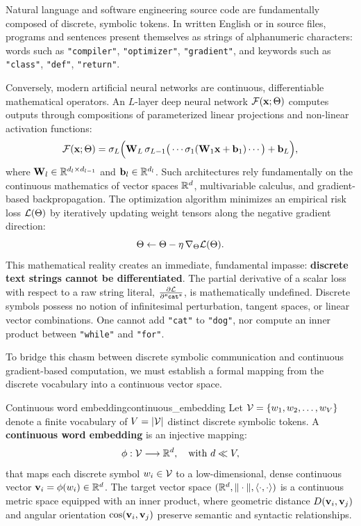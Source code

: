 \documentclass[../../main.tex]{subfiles}
\begin{document}
Natural language and software engineering source code are fundamentally composed of discrete, symbolic tokens. In written English or in source files, programs and sentences present themselves as strings of alphanumeric characters: words such as \texttt{"compiler"}, \texttt{"optimizer"}, \texttt{"gradient"}, and keywords such as \texttt{"class"}, \texttt{"def"}, \texttt{"return"}.

Conversely, modern artificial neural networks are continuous, differentiable mathematical operators. An $L$-layer deep neural network $\mathcal{F}(\mathbf{x}; \Theta)$ computes outputs through compositions of parameterized linear projections and non-linear activation functions:
\begin{equation}
\label{eq:neural_operator}
\mathcal{F}(\mathbf{x}; \Theta) = \sigma_L \Big( \mathbf{W}_L \, \sigma_{L-1}\big( \cdots \sigma_1(\mathbf{W}_1 \mathbf{x} + \mathbf{b}_1) \cdots \big) + \mathbf{b}_L \Big),
\end{equation}
where $\mathbf{W}_l \in \mathbb{R}^{d_l \times d_{l-1}}$ and $\mathbf{b}_l \in \mathbb{R}^{d_l}$. Such architectures rely fundamentally on the continuous mathematics of vector spaces $\mathbb{R}^d$, multivariable calculus, and gradient-based backpropagation. The optimization algorithm minimizes an empirical risk loss $\mathcal{L}(\Theta)$ by iteratively updating weight tensors along the negative gradient direction:
\begin{equation}
\label{eq:gradient_update_rule}
\Theta \leftarrow \Theta - \eta \, \nabla_\Theta \mathcal{L}(\Theta).
\end{equation}
This mathematical reality creates an immediate, fundamental impasse: \textbf{discrete text strings cannot be differentiated}. The partial derivative of a scalar loss with respect to a raw string literal, $\frac{\partial \mathcal{L}}{\partial \text{\texttt{"cat"}}}$, is mathematically undefined. Discrete symbols possess no notion of infinitesimal perturbation, tangent spaces, or linear vector combinations. One cannot add \texttt{"cat"} to \texttt{"dog"}, nor compute an inner product between \texttt{"while"} and \texttt{"for"}.

To bridge this chasm between discrete symbolic communication and continuous gradient-based computation, we must establish a formal mapping from the discrete vocabulary into a continuous vector space.

\begin{definition}{Continuous word embedding}{continuous_embedding}
Let $\mathcal{V} = \{w_1, w_2, \dots, w_V\}$ denote a finite vocabulary of $V = |\mathcal{V}|$ distinct discrete symbolic tokens. A \textbf{continuous word embedding} is an injective mapping:
\begin{equation}
\label{eq:embedding_mapping_def}
\phi: \mathcal{V} \longrightarrow \mathbb{R}^d, \quad \text{with } d \ll V,
\end{equation}
that maps each discrete symbol $w_i \in \mathcal{V}$ to a low-dimensional, dense continuous vector $\mathbf{v}_i = \phi(w_i) \in \mathbb{R}^d$. The target vector space $(\mathbb{R}^d, \|\cdot\|, \langle\cdot, \cdot\rangle)$ is a continuous metric space equipped with an inner product, where geometric distance $D(\mathbf{v}_i, \mathbf{v}_j)$ and angular orientation $\cos(\mathbf{v}_i, \mathbf{v}_j)$ preserve semantic and syntactic relationships.
\end{definition}
\end{document}
